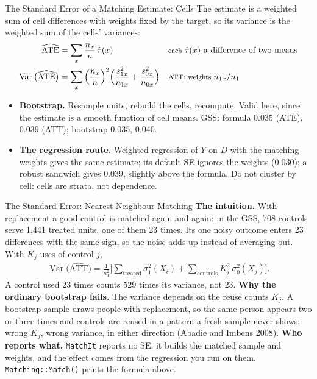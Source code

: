 \documentclass[aspectratio=169,11pt,xcolor=dvipsnames]{beamer}
\newcommand{\srcp}[1]{{\scriptsize\color{gray}(#1)}}
\DeclareMathOperator{\Var}{Var}
\begin{document}
\begin{frame}{The Standard Error of a Matching Estimate: Cells}
The estimate is a weighted sum of cell differences with weights fixed by the
target, so its variance is the weighted sum of the cells' variances:
\begin{align*}
  \widehat{\text{ATE}} &= \sum_x \frac{n_x}{n}\,\hat\tau(x)
  && \text{\footnotesize each } \hat\tau(x) \text{ a difference of two means} \\
  \Var\big(\widehat{\text{ATE}}\big)
  &= \sum_x \Big(\frac{n_x}{n}\Big)^2
    \Big(\frac{s^2_{1x}}{n_{1x}} + \frac{s^2_{0x}}{n_{0x}}\Big)
  && \text{\footnotesize ATT: weights } n_{1x}/n_1
\end{align*}
\begin{itemize}\itemsep2pt
  \item \textbf{Bootstrap.} Resample units, rebuild the cells, recompute.
        Valid here, since the estimate is a smooth function of cell means.
        GSS: formula $0.035$ (ATE), $0.039$ (ATT); bootstrap $0.035$, $0.040$.
  \item \textbf{The regression route.} Weighted regression of $Y$ on $D$ with
        the matching weights gives the same estimate; its default SE ignores
        the weights ($0.030$); a robust sandwich gives $0.039$, slightly above
        the formula. Do not cluster by cell: cells are strata, not dependence.
\end{itemize}
\end{frame}

\begin{frame}{The Standard Error: Nearest-Neighbour Matching}
\textbf{The intuition.} With replacement a good control is matched again and
again: in the GSS, 708 controls serve 1,441 treated units, one of them 23
times. Its one noisy outcome enters 23 differences with the same sign, so the
noise adds up instead of averaging out. With $K_j$ uses of control $j$,
\begin{align*}
  \Var\big(\widehat{\text{ATT}}\big)
  = \tfrac{1}{n_1^2}\Big[\textstyle\sum_{\text{treated}} \sigma_1^2(X_i)
  + \sum_{\text{controls}} K_j^{2}\,\sigma_0^2(X_j)\Big] .
\end{align*}
A control used 23 times counts $529$ times its variance, not $23$.
\vskip2pt
\textbf{Why the ordinary bootstrap fails.} The variance depends on the reuse
counts $K_j$. A bootstrap sample draws people with replacement, so the same
person appears two or three times and controls are reused in a pattern a
fresh sample never shows: wrong $K_j$, wrong variance, in either direction
\srcp{Abadie and Imbens 2008}.
\vskip2pt
\textbf{Who reports what.} \texttt{MatchIt} reports no SE: it builds the
matched sample and weights, and the effect comes from the regression you run
on them. \texttt{Matching::Match()} prints the formula above.
\end{frame}
\end{document}

